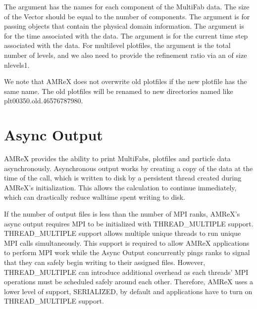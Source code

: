 \documentclass[letterpaper,10pt,english]{sphinxmanual}
\begin{document}
\begin{sphinxVerbatim}[commandchars=\\\{\}]
  
\end{sphinxVerbatim}

\sphinxAtStartPar
The argument  has the names for each component of the
MultiFab data. The size of the Vector should be equal to the
number of components. The argument  is for passing
 objects that contain the physical domain
information. The argument  is for the time associated with the
data. The argument  is for the current time step
associated with the data. For multi\sphinxhyphen{}level plotfiles, the argument
 is the total number of levels, and we also need to provide
the refinement ratio via an  of size nlevels\sphinxhyphen{}1.

\sphinxAtStartPar
We note that AMReX does not overwrite old plotfiles if the new
plotfile has the same name. The old plotfiles will be renamed to
new directories named like plt00350.old.46576787980.


\section{Async Output}
\label{\detokenize{IO:async-output}}
\sphinxAtStartPar
AMReX provides the ability to print MultiFabs, plotfiles and
particle data asynchronously.  Asynchronous output works by creating
a copy of the data at the time of the call, which is written to disk
by a persistent thread created during AMReX’s initialization.  This allows
the calculation to continue immediately, which can drastically reduce
walltime spent writing to disk.

\sphinxAtStartPar
If the number of output files is less than the number of MPI ranks,
AMReX’s async output requires MPI to be initialized with THREAD\_MULTIPLE
support. THREAD\_MULTIPLE support allows multiple unique threads to run unique
MPI calls simultaneously.  This support is required to allow AMReX applications
to perform MPI work while the Async Output concurrently pings ranks to signal
that they can safely begin writing to their assigned files.  However,
THREAD\_MULTIPLE can introduce additional overhead as each threads’ MPI operations
must be scheduled safely around each other. Therefore, AMReX uses a lower level
of support, SERIALIZED, by default and applications have to turn on THREAD\_MULTIPLE
support.
\end{document}
